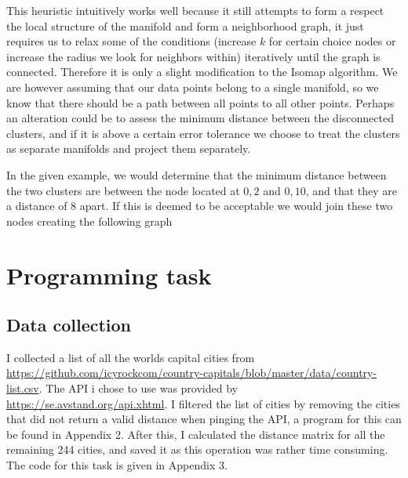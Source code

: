 \documentclass[11pt,a4paper,landscape]{article}
\begin{document}
This heuristic intuitively works well because it still attempts to form a respect the local structure of the manifold and form a neighborhood graph, it just requires us to relax some of the conditions (increase $k$ for certain choice nodes or increase the radius we look for neighbors within) iteratively until the graph is connected. Therefore it is only a slight modification to the Isomap algorithm. We are however assuming that our data points belong to a single manifold, so we know that there should be a path between all points to all other points. Perhaps an alteration could be to assess the minimum distance between the disconnected clusters, and if it is above a certain error tolerance we choose to treat the clusters as separate manifolds and project them separately.\newline

In the given example, we would determine that the minimum distance between the two clusters are between the node located at $0, 2$ and $0, 10$, and that they are a distance of 8 apart. If this is deemed to be acceptable we would join these two nodes creating the following graph


\section{Programming task}

\subsection{Data collection}
I collected a list of all the worlds capital cities from \url{https://github.com/icyrockcom/country-capitals/blob/master/data/country-list.csv}. The API i chose to use was provided by \url{https://se.avstand.org/api.xhtml}. I filtered the list of cities by removing the cities that did not return a valid distance when pinging the API, a program for this can be found in Appendix 2. After this, I calculated the distance matrix for all the remaining 244 cities, and saved it as this operation was rather time consuming. The code for this task is given in Appendix 3.
\end{document}
